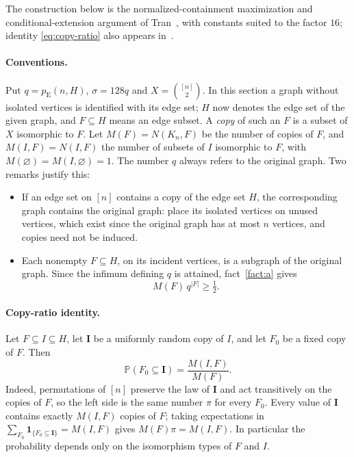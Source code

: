 \documentclass[11pt]{article}
\numberwithin{equation}{section}
\newcommand{\PP}{\mathbb P}
\newcommand{\pE}{p_{\mathrm E}}
\newcommand{\ind}{\mathbf 1}
\begin{document}
The construction below is the normalized-containment maximization and
conditional-extension argument of
Tran~\cite[Section~3, Lemma~3.1]{Tran26}, with constants suited to the
factor $16$; identity \eqref{eq:copy-ratio} also appears
in~\cite[Equation~(5)]{MNSZ22}.

\paragraph{Conventions.}
Put $q=\pE(n,H)$, $\sigma=128q$ and $X=\binom{[n]}2$. In this section a
graph without isolated vertices is identified with its edge set; $H$ now
denotes the edge set of the given graph, and $F\subseteq H$ means an edge
subset. A \emph{copy} of such an $F$ is a subset of $X$ isomorphic to
$F$. Let $M(F)=N(K_n,F)$ be the number of copies of $F$, and
$M(I,F)=N(I,F)$ the number of subsets of $I$ isomorphic to $F$, with
$M(\varnothing)=M(I,\varnothing)=1$. The number $q$ always refers to the
original graph. Two remarks justify this:
\begin{itemize}[itemsep=1pt,topsep=2pt]
 \item If an edge set on $[n]$ contains a copy of the edge set $H$, the
 corresponding graph contains the original graph: place its isolated
 vertices on unused vertices, which exist since the original graph has at
 most $n$ vertices, and copies need not be induced.
 \item Each nonempty $F\subseteq H$, on its incident vertices, is a
 subgraph of the original graph. Since the infimum defining $q$ is
 attained, fact~\ref{fact:a} gives
 \begin{equation}\label{eq:first-moment}
  M(F)\,q^{|F|}\ge\tfrac12.
 \end{equation}
\end{itemize}

\paragraph{Copy-ratio identity.}
Let $F\subseteq I\subseteq H$, let $\boldsymbol I$ be a uniformly random
copy of $I$, and let $F_0$ be a fixed copy of $F$. Then
\begin{equation}\label{eq:copy-ratio}
 \PP(F_0\subseteq\boldsymbol I)=\frac{M(I,F)}{M(F)}.
\end{equation}
Indeed, permutations of $[n]$ preserve the law of $\boldsymbol I$ and act
transitively on the copies of $F$, so the left side is the same number
$\pi$ for every $F_0$. Every value of $\boldsymbol I$ contains exactly
$M(I,F)$ copies of $F$; taking expectations in
$\sum_{F_0}\ind_{\{F_0\subseteq\boldsymbol I\}}=M(I,F)$ gives
$M(F)\pi=M(I,F)$. In particular the probability depends only on the
isomorphism types of $F$ and $I$.
\end{document}
